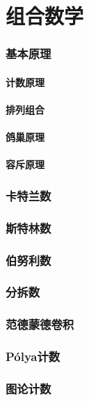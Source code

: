 \documentclass[12pt,a4paper]{article}
\begin{document}
\newpage
\part{组合数学}
\section{基本原理}
\subsection{计数原理}
\subsection{排列组合}
\subsection{鸽巢原理}
\subsection{容斥原理}

\newpage
\section{卡特兰数}

\newpage
\section{斯特林数}

\newpage
\section{伯努利数}

\newpage
\section{分拆数}

\newpage
\section{范德蒙德卷积}

\newpage
\section{Pólya计数} %

\newpage
\section{图论计数}
\end{document}
